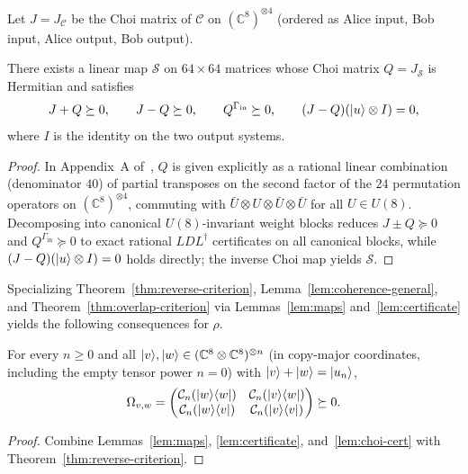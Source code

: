 Let $J = J_{\mathcal{C}}$ be the Choi matrix of $\mathcal{C}$ on $(\mathbb{C}^8)^{\otimes 4}$ (ordered as Alice input, Bob input, Alice output, Bob output).

\begin{lemma}
\label{lem:certificate}
\leanok
{}
There exists a linear map $\mathcal{S}$ on $64\times 64$ matrices whose Choi matrix $Q = J_{\mathcal{S}}$ is Hermitian and satisfies
\[
  J + Q \succeq 0, \qquad J - Q \succeq 0, \qquad
  Q^{\Gamma_{\mathrm{in}}} \succeq 0, \qquad
  (J - Q)(|u\rangle\otimes I) = 0,
\]
where $I$ is the identity on the two output systems.
\end{lemma}
\begin{proof}
\leanok
In Appendix~A of~\cite{Faisal2026}, $Q$ is given explicitly as a rational linear combination (denominator $40$) of partial transposes on the second factor of the $24$ permutation operators on $(\mathbb{C}^8)^{\otimes 4}$, commuting with $\bar{U}\otimes U\otimes\bar{U}\otimes\bar{U}$ for all $U\in U(8)$. Decomposing into canonical $U(8)$-invariant weight blocks reduces $J\pm Q\succeq 0$ and $Q^{\Gamma_{\mathrm{in}}}\succeq 0$ to exact rational $LDL^{\dagger}$ certificates on all canonical blocks, while $(J-Q)(|u\rangle\otimes I)=0$ holds directly; the inverse Choi map yields $\mathcal{S}$.
\end{proof}

Specializing Theorem~\ref{thm:reverse-criterion}, Lemma~\ref{lem:coherence-general}, and Theorem~\ref{thm:overlap-criterion} via Lemmas~\ref{lem:maps} and~\ref{lem:certificate} yields the following consequences for $\rho$.

\begin{lemma}
\label{lem:reverse}
\leanok
{}
For every $n\ge 0$ and all $|v\rangle,|w\rangle\in(\mathbb{C}^8\otimes\mathbb{C}^8)^{\otimes n}$ (in copy-major coordinates, including the empty tensor power $n=0$) with $|v\rangle+|w\rangle=|u_n\rangle$,
\[
  \Omega_{v,w} =
  \begin{pmatrix}
    \mathcal{C}_n(|w\rangle\langle w|) & \mathcal{C}_n(|v\rangle\langle w|) \\
    \mathcal{C}_n(|w\rangle\langle v|) & \mathcal{C}_n(|v\rangle\langle v|)
  \end{pmatrix}
  \succeq 0.
\]
\end{lemma}
\begin{proof}
\leanok
Combine Lemmas~\ref{lem:maps}, \ref{lem:certificate}, and~\ref{lem:choi-cert} with Theorem~\ref{thm:reverse-criterion}.
\end{proof}

